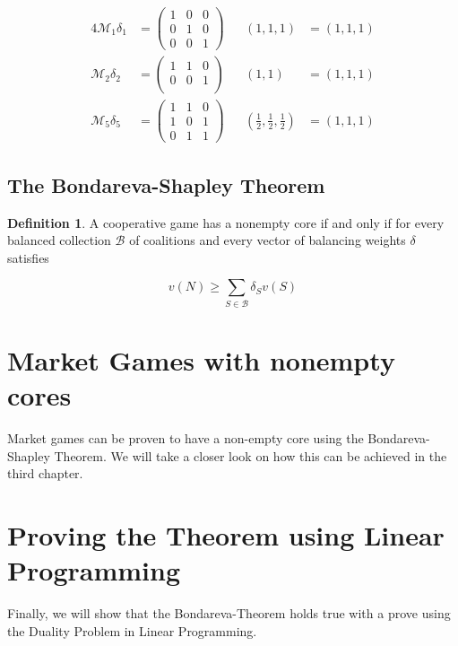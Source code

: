 \documentclass[10pt,a4paper,titlepage]{article}
\theoremstyle{plain}
\theoremstyle{definition}
\newtheorem{definition}[thm]{Definition} %
\begin{document}
\begin{alignat*}{4}
    \mathcal{M}_1 \delta_1 &= \begin{pmatrix}
        1 & 0 & 0\\
        0 & 1 & 0\\
        0 & 0 & 1
    \end{pmatrix}&&\left(1, 1, 1\right) &= (1, 1, 1)\\
%
    \mathcal{M}_2 \delta_2 &= \begin{pmatrix}
        1 & 1 & 0\\
        0 & 0 & 1\\
    \end{pmatrix}&&\left(1, 1\right) &= (1, 1, 1)\\
%
    \mathcal{M}_5 \delta_5 &= \begin{pmatrix}
        1 & 1 & 0\\
        1 & 0 & 1\\
        0 & 1 & 1
    \end{pmatrix}&&\left(\frac{1}{2}, \frac{1}{2}, \frac{1}{2}\right) &= (1, 1, 1)
\end{alignat*}

\subsection{The Bondareva-Shapley Theorem}

\begin{definition}
    A cooperative game has a nonempty core if and only if for every balanced collection $\mathcal{B}$ of coalitions and every vector of balancing weights $\delta$ satisfies

    \begin{equation}
        v(N) \geq \sum_{S \in \mathcal{B}} \delta_S v(S)
    \end{equation}
\end{definition}

\section{Market Games with nonempty cores}
Market games can be proven to have a non-empty core using the Bondareva-Shapley Theorem. We will take a closer look on how this can be achieved in the third chapter.

\section{Proving the Theorem using Linear Programming}
Finally, we will show that the Bondareva-Theorem holds true with a prove using the Duality Problem in Linear Programming.
 
\pagebreak
 
\printbibliography
\end{document}
